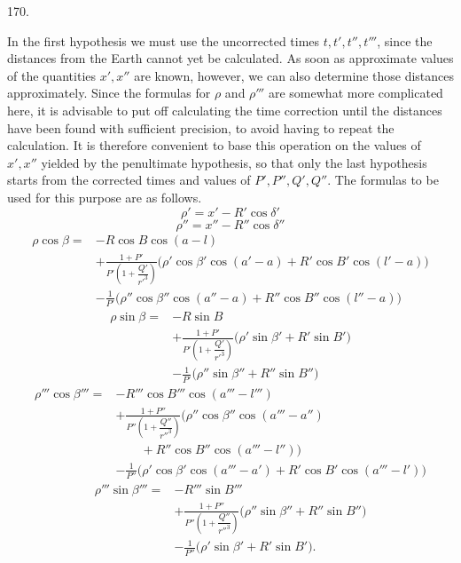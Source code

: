 \par{}\medskip
\begin{center}\hypertarget{native-235-article170}{}170.\end{center}
In the first hypothesis we must use the uncorrected times $t,t',t'',t'''$, since the distances from the Earth cannot yet be calculated. As soon as approximate values of the quantities $x',x''$ are known, however, we can also determine those distances approximately. Since the formulas for $\rho$ and $\rho'''$ are somewhat more complicated here, it is advisable to put off calculating the time correction until the distances have been found with sufficient precision, to avoid having to repeat the calculation. It is therefore convenient to base this operation on the values of $x',x''$ yielded by the penultimate hypothesis, so that only the last hypothesis starts from the corrected times and values of $P',P'',Q',Q''$. The formulas to be used for this purpose are as follows.
\[
\tag*{VII.}
\rho'=x'-R'\cos\delta'
\]
\[
\tag*{VIII.}
\rho''=x''-R''\cos\delta''
\]
\[
\tag*{IX.}
\begin{aligned}
\rho\cos\beta={}&-R\cos B\cos(a-l)\\
&+\frac{1+P'}{P'\left(1+\dfrac{Q'}{r'^3}\right)}\bigl(\rho'\cos\beta'\cos(a'-a)+R'\cos B'\cos(l'-a)\bigr)\\
&-\frac{1}{P'}\bigl(\rho''\cos\beta''\cos(a''-a)+R''\cos B''\cos(l''-a)\bigr)
\end{aligned}
\]
\[
\tag*{X.}
\begin{aligned}
\rho\sin\beta={}&-R\sin B\\
&+\frac{1+P'}{P'\left(1+\dfrac{Q'}{r'^3}\right)}\bigl(\rho'\sin\beta'+R'\sin B'\bigr)\\
&-\frac{1}{P'}\bigl(\rho''\sin\beta''+R''\sin B''\bigr)
\end{aligned}
\]
\[
\tag*{XI.}
\begin{aligned}
\rho'''\cos\beta'''={}&-R'''\cos B'''\cos(a'''-l''')\\
&+\frac{1+P''}{P''\left(1+\dfrac{Q''}{r''^3}\right)}\bigl(\rho''\cos\beta''\cos(a'''-a'')\\
&\qquad{}+R''\cos B''\cos(a'''-l'')\bigr)\\
&-\frac{1}{P''}\bigl(\rho'\cos\beta'\cos(a'''-a')+R'\cos B'\cos(a'''-l')\bigr)
\end{aligned}
\]
\[
\tag*{XII.}
\begin{aligned}
\rho'''\sin\beta'''={}&-R'''\sin B'''\\
&+\frac{1+P''}{P''\left(1+\dfrac{Q''}{r''^3}\right)}\bigl(\rho''\sin\beta''+R''\sin B''\bigr)\\
&-\frac{1}{P''}\bigl(\rho'\sin\beta'+R'\sin B'\bigr).
\end{aligned}
\]
